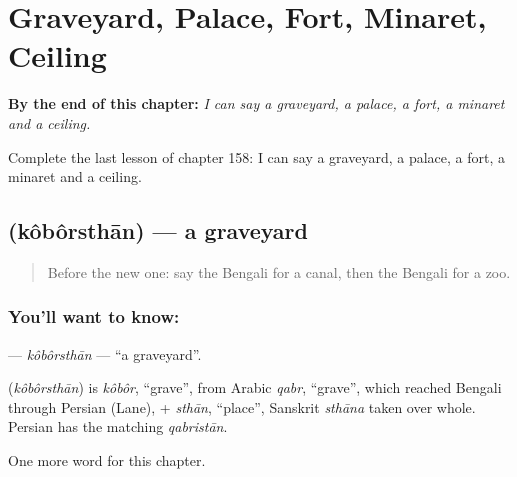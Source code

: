 
\chapter{Graveyard, Palace, Fort, Minaret, Ceiling}
\label{ch:bn-graveyard-palace-fort-minaret-ceiling}

\begin{chapteropening}
\textbf{By the end of this chapter:} \emph{I can say a graveyard, a palace, a fort, a minaret and a ceiling.}

Complete the last lesson of chapter 158: I can say a graveyard, a palace, a fort, a minaret and a ceiling.
\end{chapteropening}

\section[\texorpdfstring{\bn{কবরস্থান} (kôbôrsthān)}{কবরস্থান (kôbôrsthān)}]{ (kôbôrsthān) — a graveyard}

\label{lesson:BN-C158-koborsthan}



\begin{quote}
Before the new one: say the Bengali for a canal, then the Bengali for a zoo.
\end{quote}

\subsection*{You'll want to know: }
\textbf{} — \emph{kôbôrsthān} — \textquotedblleft{}a graveyard\textquotedblright{}.

\begin{cousinweb}
\textbf{} (\emph{kôbôrsthān}) is \emph{kôbôr}, \textquotedblleft{}grave\textquotedblright{}, from Arabic \emph{qabr}, \textquotedblleft{}grave\textquotedblright{}, which reached Bengali through Persian (Lane), + \emph{sthān}, \textquotedblleft{}place\textquotedblright{}, Sanskrit \emph{sthāna} taken over whole. Persian has the matching \emph{qabristān}.
\end{cousinweb}

\begin{grammarlens}[title={What you've built}]
One more word for this chapter.
\end{grammarlens}

